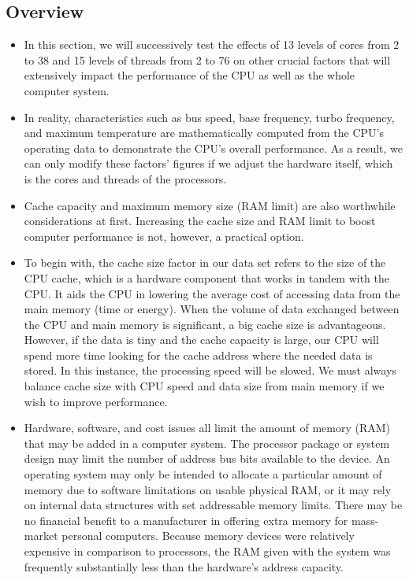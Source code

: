 \documentclass[a4paper]{article}
\begin{document}
\subsection{Overview}
\begin{itemize}
    \item[] In this section, we will successively test the effects of 13 levels of cores from 2 to 38 and 15 levels of threads from 2 to 76 on other crucial factors that will extensively impact the performance of the CPU as well as the whole computer system. 
    
    \item[] In reality, characteristics such as bus speed, base frequency, turbo frequency, and maximum temperature are mathematically computed from the CPU's operating data to demonstrate the CPU's overall performance. As a result, we can only modify these factors' figures if we adjust the hardware itself, which is the cores and threads of the processors.
    
    \item[] Cache capacity and maximum memory size (RAM limit) are also worthwhile considerations at first. Increasing the cache size and RAM limit to boost computer performance is not, however, a practical option.
    
    \item[] To begin with, the cache size factor in our data set refers to the size of the CPU cache, which is a hardware component that works in tandem with the CPU. It aids the CPU in lowering the average cost of accessing data from the main memory (time or energy). When the volume of data exchanged between the CPU and main memory is significant, a big cache size is advantageous. However, if the data is tiny and the cache capacity is large, our CPU will spend more time looking for the cache address where the needed data is stored. In this instance, the processing speed will be slowed. We must always balance cache size with CPU speed and data size from main memory if we wish to improve performance.
    
    \item[] Hardware, software, and cost issues all limit the amount of memory (RAM) that may be added in a computer system. The processor package or system design may limit the number of address bus bits available to the device. An operating system may only be intended to allocate a particular amount of memory due to software limitations on usable physical RAM, or it may rely on internal data structures with set addressable memory limits. There may be no financial benefit to a manufacturer in offering extra memory for mass-market personal computers. Because memory devices were relatively expensive in comparison to processors, the RAM given with the system was frequently substantially less than the hardware's address capacity.
    

\end{itemize}
\end{document}
